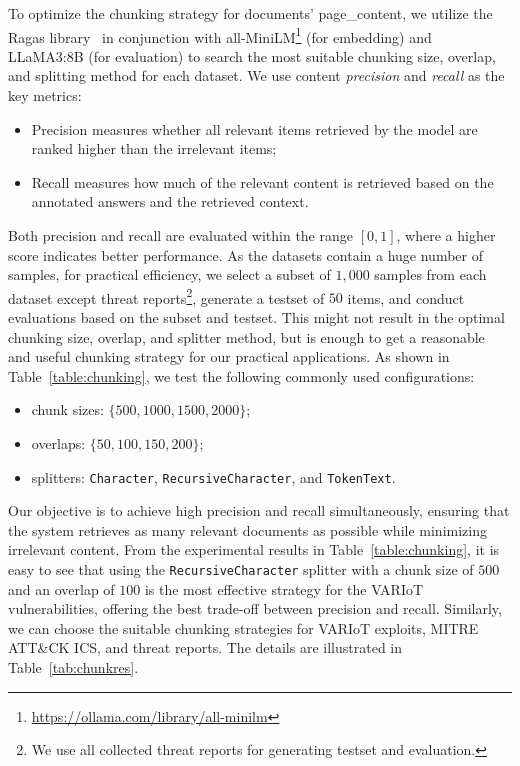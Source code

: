To optimize the chunking strategy for documents' page\_content, we utilize the Ragas library~\cite{es2023ragas} in conjunction with all-MiniLM\footnote{\scriptsize \url{https://ollama.com/library/all-minilm}} (for embedding) and LLaMA3:8B (for evaluation) to search the most suitable chunking size, overlap, and splitting method for each dataset. We use content \textit{precision} and \textit{recall} as the key metrics: 
\begin{itemize}
    \item Precision measures whether all relevant items retrieved by the model are ranked higher than the irrelevant items;
    \item Recall measures how much of the relevant content is retrieved based on the annotated answers and the retrieved context.
\end{itemize}
Both precision and recall are evaluated within the range $[0,1]$, where a higher score indicates better performance.
As the datasets contain a huge number of samples, for practical efficiency, we select a subset of $1,000$ samples from each dataset except threat reports\footnote{\scriptsize We use all collected threat reports for generating testset and evaluation.}, generate a testset of $50$ items, and conduct evaluations based on the subset and testset.
This might not result in the optimal chunking size, overlap, and splitter method, but is enough to get a reasonable and useful chunking strategy for our practical applications.
As shown in Table~\ref{table:chunking}, we test the following commonly used configurations:
\begin{itemize}
    \item chunk sizes: $\{500, 1000, 1500, 2000\}$;
    \item overlaps: $\{50, 100, 150, 200\}$; 
    \item splitters: \texttt{Character}, \texttt{RecursiveCharacter}, and \texttt{TokenText}.
\end{itemize}
Our objective is to achieve high precision and recall simultaneously, ensuring that the system retrieves as many relevant documents as possible while minimizing irrelevant content. 
From the experimental results in Table~\ref{table:chunking}, it is easy to see that using the \texttt{RecursiveCharacter} splitter with a chunk size of $500$ and an overlap of $100$ is the most effective strategy for the VARIoT vulnerabilities, offering the best trade-off between precision and recall. 
Similarly, we can choose the suitable chunking strategies for VARIoT exploits, MITRE ATT\&CK ICS, and threat reports. The details are illustrated in Table~\ref{tab:chunkres}.



